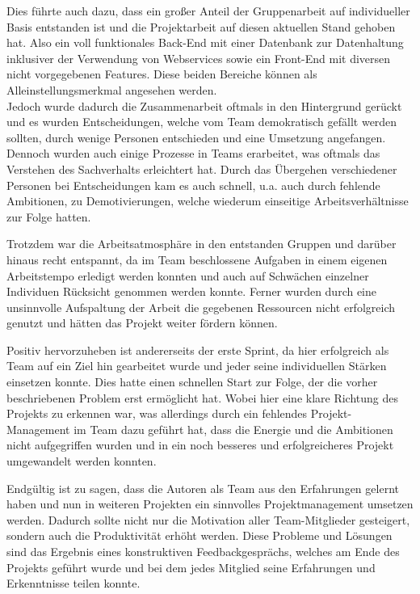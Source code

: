Dies führte auch dazu, dass ein großer Anteil der Gruppenarbeit auf individueller Basis entstanden ist und die Projektarbeit auf diesen aktuellen Stand gehoben hat. Also ein voll funktionales Back-End mit einer Datenbank zur Datenhaltung inklusiver der Verwendung von Webservices sowie ein Front-End mit diversen nicht vorgegebenen Features. Diese beiden Bereiche können als Alleinstellungsmerkmal angesehen werden.\\
Jedoch wurde dadurch die Zusammenarbeit oftmals in den Hintergrund gerückt und es wurden Entscheidungen, welche vom Team demokratisch gefällt werden sollten, durch wenige Personen entschieden und eine Umsetzung angefangen. Dennoch wurden auch einige Prozesse in Teams erarbeitet, was oftmals das Verstehen des Sachverhalts erleichtert hat.
Durch das Übergehen verschiedener Personen bei Entscheidungen kam es auch schnell, u.a. auch durch fehlende Ambitionen, zu Demotivierungen, welche wiederum einseitige Arbeitsverhältnisse zur Folge hatten.

Trotzdem war die Arbeitsatmosphäre in den entstanden Gruppen und darüber hinaus recht entspannt, da im Team beschlossene Aufgaben in einem eigenen Arbeitstempo erledigt werden konnten und auch auf Schwächen einzelner Individuen Rücksicht genommen werden konnte.
Ferner wurden durch eine unsinnvolle Aufspaltung der Arbeit die gegebenen Ressourcen nicht erfolgreich genutzt und hätten das Projekt weiter fördern können.

Positiv hervorzuheben ist andererseits der erste Sprint, da hier erfolgreich als Team auf ein Ziel hin gearbeitet wurde und jeder seine individuellen Stärken einsetzen konnte.
Dies hatte einen schnellen Start zur Folge, der die vorher beschriebenen Problem erst ermöglicht hat.
Wobei hier eine klare Richtung des Projekts zu erkennen war, was allerdings durch ein fehlendes Projekt-Management im Team dazu geführt hat, dass die Energie und die Ambitionen nicht aufgegriffen wurden und in ein noch besseres und erfolgreicheres Projekt umgewandelt werden konnten.

Endgültig ist zu sagen, dass die Autoren als Team aus den Erfahrungen gelernt haben und nun in weiteren Projekten ein sinnvolles Projektmanagement umsetzen werden.
Dadurch sollte nicht nur die Motivation aller Team-Mitglieder gesteigert, sondern auch die Produktivität erhöht werden.
Diese Probleme und Lösungen sind das Ergebnis eines konstruktiven Feedbackgesprächs, welches am Ende des Projekts geführt wurde und bei dem jedes Mitglied seine Erfahrungen und Erkenntnisse teilen konnte.
